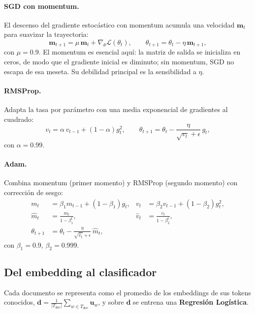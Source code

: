 \documentclass[11pt]{article}
\begin{document}
\paragraph{SGD con momentum.} El descenso del gradiente estocástico con momentum acumula una
velocidad $\mathbf{m}_t$ para suavizar la trayectoria:
\begin{equation}\label{eq:sgd}
\mathbf{m}_{t+1}=\mu\,\mathbf{m}_t+\nabla_\theta \mathcal{L}(\theta_t),\qquad
\theta_{t+1}=\theta_t-\eta\,\mathbf{m}_{t+1},
\end{equation}
con $\mu=0.9$. El momentum es esencial aquí: la matriz de salida se inicializa en ceros, de
modo que el gradiente inicial es diminuto; sin momentum, SGD no escapa de esa meseta. Su
debilidad principal es la sensibilidad a $\eta$.

\paragraph{RMSProp.} Adapta la tasa por parámetro con una media exponencial de gradientes al
cuadrado:
\begin{equation}
v_t=\alpha\,v_{t-1}+(1-\alpha)g_t^2,\qquad
\theta_{t+1}=\theta_t-\frac{\eta}{\sqrt{v_t}+\epsilon}\,g_t,
\end{equation}
con $\alpha=0.99$.

\paragraph{Adam.} Combina momentum (primer momento) y RMSProp (segundo momento) con
corrección de sesgo:
\begin{align}
m_t&=\beta_1 m_{t-1}+(1-\beta_1)g_t, & v_t&=\beta_2 v_{t-1}+(1-\beta_2)g_t^2,\\
\hat{m}_t&=\tfrac{m_t}{1-\beta_1^t}, & \hat{v}_t&=\tfrac{v_t}{1-\beta_2^t},\\
\theta_{t+1}&=\theta_t-\frac{\eta}{\sqrt{\hat{v}_t}+\epsilon}\,\hat{m}_t,
\end{align}
con $\beta_1=0.9$, $\beta_2=0.999$.

\subsection{Del embedding al clasificador}
Cada documento se representa como el promedio de los embeddings de sus tokens conocidos,
$\mathbf{d}=\frac{1}{|T_{doc}|}\sum_{w\in T_{doc}}\mathbf{u}_w$, y sobre $\mathbf{d}$ se
entrena una \textbf{Regresión Logística}.

\end{document}

